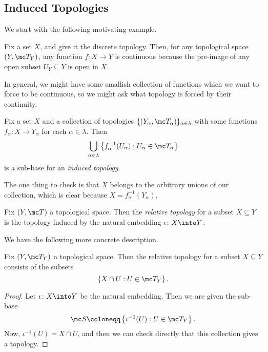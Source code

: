 \documentclass[../notes.tex]{subfiles}
\begin{document}
\subsection{Induced Topologies}
We start with the following motivating example.
\begin{example}
	Fix a set $X$, and give it the discrete topology. Then, for any topological space $(Y,\mc T_Y)$, any function $f\colon X\to Y$ is continuous because the pre-image of any open subset $U_Y\subseteq Y$ is open in $X$.
\end{example}
In general, we might have some smallish collection of functions which we want to force to be continuous, so we might ask what topology is forced by their continuity.
\begin{defi}
	Fix a set $X$ and a collection of topologies $\{(Y_\alpha,\mc T_\alpha)\}_{\alpha\in\lambda}$ with some functions $f_\alpha\colon X\to Y_\alpha$ for each $\alpha\in\lambda$. Then
	\[\bigcup_{\alpha\in\lambda}\left\{f_\alpha^{-1}(U_\alpha):U_\alpha\in\mc T_\alpha\right\}\]
	is a sub-base for an \textit{induced topology}.
\end{defi}
The one thing to check is that $X$ belongs to the arbitrary unions of our collection, which is clear because $X=f^{-1}_\alpha(Y_\alpha)$.
\begin{definition}
	Fix $(Y,\mc T)$ a topological space. Then the \textit{relative topology} for a subset $X\subseteq Y$ is the topology induced by the natural embedding $\iota\colon X\into Y$.
\end{definition}
We have the following more concrete description.
\begin{lemma}
	Fix $(Y,\mc T_Y)$ a topological space. Then the relative topology for a subset $X\subseteq Y$ consists of the subsets
	\[\left\{X\cap U:U\in\mc T_Y\right\}.\]
\end{lemma}
\begin{proof}
	Let $\iota\colon X\into Y$ be the natural embedding. Then we are given the sub-base
	\[\mc S\coloneqq\left\{\iota^{-1}(U):U\in\mc T_Y\right\}.\]
	Now, $\iota^{-1}(U)=X\cap U$, and then we can check directly that this collection gives a topology.
\end{proof}
\end{document}
